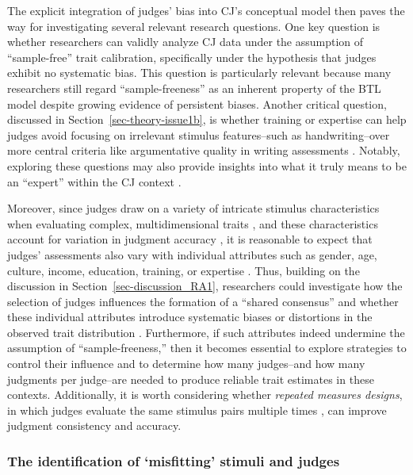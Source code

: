 \documentclass[
  authoryear,
  review,
  1p]{elsarticle}
\begin{document}
The explicit integration of judges' bias into CJ's conceptual model then
paves the way for investigating several relevant research questions. One
key question is whether researchers can validly analyze CJ data under
the assumption of ``sample-free'' trait calibration, specifically under
the hypothesis that judges exhibit no systematic bias. This question is
particularly relevant because many researchers still regard
``sample-freeness'' as an inherent property of the BTL model
\citep{Bramley_2008, Andrich_1978} despite growing evidence of
persistent biases. Another critical question, discussed in
Section~\ref{sec-theory-issue1b}, is whether training or expertise can
help judges avoid focusing on irrelevant stimulus features--such as
handwriting--over more central criteria like argumentative quality in
writing assessments \citep{Kelly_et_al_2022}. Notably, exploring these
questions may also provide insights into what it truly means to be an
``expert'' within the CJ context \citep{Kelly_et_al_2022}.

Moreover, since judges draw on a variety of intricate stimulus
characteristics when evaluating complex, multidimensional traits
\citep{vanDaal_et_al_2016, Lesterhuis_et_al_2018, Chambers_et_al_2022},
and these characteristics account for variation in judgment accuracy
\citep{Gill_et_al_2013, vanDaal_et_al_2017, vanDaal_2020, Gijsen_et_al_2021},
it is reasonable to expect that judges' assessments also vary with
individual attributes such as gender, age, culture, income, education,
training, or expertise
\citep{Kelly_et_al_2022, Bartholomew_et_al_2020a}. Thus, building on the
discussion in Section~\ref{sec-discussion_RA1}, researchers could
investigate how the selection of judges influences the formation of a
``shared consensus'' and whether these individual attributes introduce
systematic biases or distortions in the observed trait distribution
\citep{Deffner_et_al_2022}. Furthermore, if such attributes indeed
undermine the assumption of ``sample-freeness,'' then it becomes
essential to explore strategies to control their influence and to
determine how many judges--and how many judgments per judge--are needed
to produce reliable trait estimates in these contexts. Additionally, it
is worth considering whether \emph{repeated measures designs}, in which
judges evaluate the same stimulus pairs multiple times
\citep{Lawson_2015}, can improve judgment consistency and accuracy.

\subsubsection{The identification of `misfitting' stimuli and
judges}\label{sec-discussion_RA3}
\end{document}

